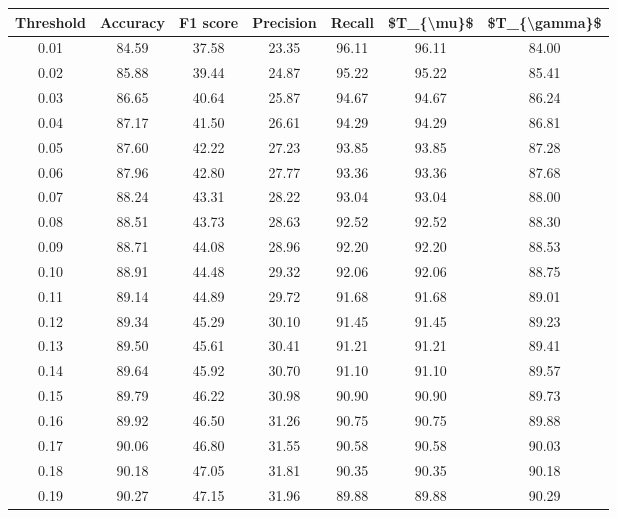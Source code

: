 \begin{tabular}{|c|c|c|c|c|c|c|}
\hline
 Threshold &  Accuracy &  F1 score &  Precision &  Recall &  \$T\_\{\textbackslash mu\}\$ &  \$T\_\{\textbackslash gamma\}\$ \\
\hline
      0.01 &     84.59 &     37.58 &      23.35 &   96.11 &      96.11 &         84.00 \\
      0.02 &     85.88 &     39.44 &      24.87 &   95.22 &      95.22 &         85.41 \\
      0.03 &     86.65 &     40.64 &      25.87 &   94.67 &      94.67 &         86.24 \\
      0.04 &     87.17 &     41.50 &      26.61 &   94.29 &      94.29 &         86.81 \\
      0.05 &     87.60 &     42.22 &      27.23 &   93.85 &      93.85 &         87.28 \\
      0.06 &     87.96 &     42.80 &      27.77 &   93.36 &      93.36 &         87.68 \\
      0.07 &     88.24 &     43.31 &      28.22 &   93.04 &      93.04 &         88.00 \\
      0.08 &     88.51 &     43.73 &      28.63 &   92.52 &      92.52 &         88.30 \\
      0.09 &     88.71 &     44.08 &      28.96 &   92.20 &      92.20 &         88.53 \\
      0.10 &     88.91 &     44.48 &      29.32 &   92.06 &      92.06 &         88.75 \\
      0.11 &     89.14 &     44.89 &      29.72 &   91.68 &      91.68 &         89.01 \\
      0.12 &     89.34 &     45.29 &      30.10 &   91.45 &      91.45 &         89.23 \\
      0.13 &     89.50 &     45.61 &      30.41 &   91.21 &      91.21 &         89.41 \\
      0.14 &     89.64 &     45.92 &      30.70 &   91.10 &      91.10 &         89.57 \\
      0.15 &     89.79 &     46.22 &      30.98 &   90.90 &      90.90 &         89.73 \\
      0.16 &     89.92 &     46.50 &      31.26 &   90.75 &      90.75 &         89.88 \\
      0.17 &     90.06 &     46.80 &      31.55 &   90.58 &      90.58 &         90.03 \\
      0.18 &     90.18 &     47.05 &      31.81 &   90.35 &      90.35 &         90.18 \\
      0.19 &     90.27 &     47.15 &      31.96 &   89.88 &      89.88 &         90.29 \\

\end{tabular}
